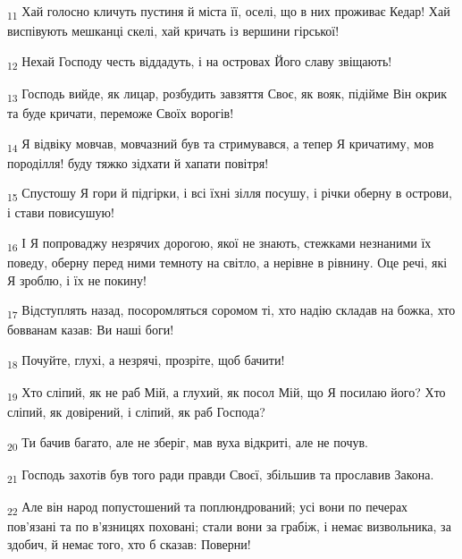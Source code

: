 \begin{tcolorbox}
\textsubscript{11} Хай голосно кличуть пустиня й міста її, оселі, що в них проживає Кедар! Хай виспівують мешканці скелі, хай кричать із вершини гірської!
\end{tcolorbox}
\begin{tcolorbox}
\textsubscript{12} Нехай Господу честь віддадуть, і на островах Його славу звіщають!
\end{tcolorbox}
\begin{tcolorbox}
\textsubscript{13} Господь вийде, як лицар, розбудить завзяття Своє, як вояк, підійме Він окрик та буде кричати, переможе Своїх ворогів!
\end{tcolorbox}
\begin{tcolorbox}
\textsubscript{14} Я відвіку мовчав, мовчазний був та стримувався, а тепер Я кричатиму, мов породілля! буду тяжко зідхати й хапати повітря!
\end{tcolorbox}
\begin{tcolorbox}
\textsubscript{15} Спустошу Я гори й підгірки, і всі їхні зілля посушу, і річки оберну в острови, і стави повисушую!
\end{tcolorbox}
\begin{tcolorbox}
\textsubscript{16} І Я попроваджу незрячих дорогою, якої не знають, стежками незнаними їх поведу, оберну перед ними темноту на світло, а нерівне в рівнину. Оце речі, які Я зроблю, і їх не покину!
\end{tcolorbox}
\begin{tcolorbox}
\textsubscript{17} Відступлять назад, посоромляться соромом ті, хто надію складав на божка, хто бовванам казав: Ви наші боги!
\end{tcolorbox}
\begin{tcolorbox}
\textsubscript{18} Почуйте, глухі, а незрячі, прозріте, щоб бачити!
\end{tcolorbox}
\begin{tcolorbox}
\textsubscript{19} Хто сліпий, як не раб Мій, а глухий, як посол Мій, що Я посилаю його? Хто сліпий, як довірений, і сліпий, як раб Господа?
\end{tcolorbox}
\begin{tcolorbox}
\textsubscript{20} Ти бачив багато, але не зберіг, мав вуха відкриті, але не почув.
\end{tcolorbox}
\begin{tcolorbox}
\textsubscript{21} Господь захотів був того ради правди Своєї, збільшив та прославив Закона.
\end{tcolorbox}
\begin{tcolorbox}
\textsubscript{22} Але він народ попустошений та поплюндрований; усі вони по печерах пов'язані та по в'язницях поховані; стали вони за грабіж, і немає визвольника, за здобич, й немає того, хто б сказав: Поверни!
\end{tcolorbox}
